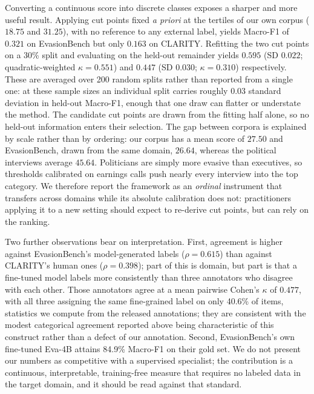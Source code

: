 \documentclass[conference]{IEEEtran}
\begin{document}
Converting a continuous score into discrete classes exposes a sharper and more useful result. Applying cut points fixed \emph{a priori} at the tertiles of our own corpus ($18.75$ and $31.25$), with no reference to any external label, yields Macro-F1 of $0.321$ on EvasionBench but only $0.163$ on CLARITY. Refitting the two cut points on a 30\% split and evaluating on the held-out remainder yields $0.595$ (SD $0.022$; quadratic-weighted $\kappa = 0.551$) and $0.447$ (SD $0.030$; $\kappa = 0.310$) respectively. These are averaged over 200 random splits rather than reported from a single one: at these sample sizes an individual split carries roughly $0.03$ standard deviation in held-out Macro-F1, enough that one draw can flatter or understate the method. The candidate cut points are drawn from the fitting half alone, so no held-out information enters their selection. The gap between corpora is explained by scale rather than by ordering: our corpus has a mean score of $27.50$ and EvasionBench, drawn from the same domain, $26.64$, whereas the political interviews average $45.64$. Politicians are simply more evasive than executives, so thresholds calibrated on earnings calls push nearly every interview into the top category. We therefore report the framework as an \emph{ordinal} instrument that transfers across domains while its absolute calibration does not: practitioners applying it to a new setting should expect to re-derive cut points, but can rely on the ranking.

Two further observations bear on interpretation. First, agreement is higher against EvasionBench's model-generated labels ($\rho = 0.615$) than against CLARITY's human ones ($\rho = 0.398$); part of this is domain, but part is that a fine-tuned model labels more consistently than three annotators who disagree with each other. Those annotators agree at a mean pairwise Cohen's $\kappa$ of $0.477$, with all three assigning the same fine-grained label on only 40.6\% of items, statistics we compute from the released annotations; they are consistent with the modest categorical agreement reported above being characteristic of this construct rather than a defect of our annotation. Second, EvasionBench's own fine-tuned Eva-4B attains 84.9\% Macro-F1 on their gold set. We do not present our numbers as competitive with a supervised specialist; the contribution is a continuous, interpretable, training-free measure that requires no labeled data in the target domain, and it should be read against that standard.
\end{document}
